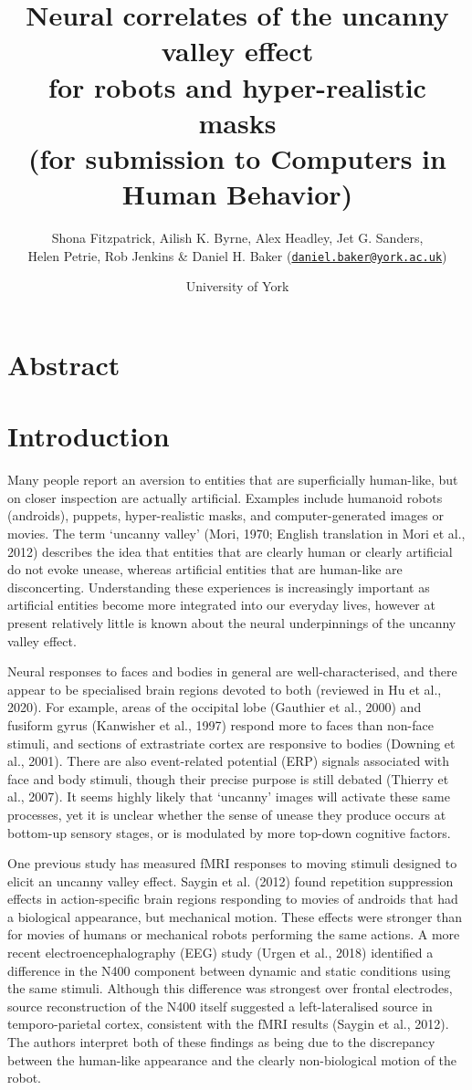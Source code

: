 \documentclass[
]{article}
\title{Neural correlates of the uncanny valley effect\\
for robots and hyper-realistic masks\\
(for submission to Computers in Human Behavior)}
\author{Shona Fitzpatrick, Ailish K. Byrne, Alex Headley, Jet G. Sanders,\\
Helen Petrie, Rob Jenkins \& Daniel H. Baker (\href{mailto:daniel.baker@york.ac.uk}{\nolinkurl{daniel.baker@york.ac.uk}})}
\date{University of York}
\begin{document}
\maketitle

\hypertarget{abstract}{%
\section{Abstract}\label{abstract}}

\hypertarget{introduction}{%
\section{Introduction}\label{introduction}}

Many people report an aversion to entities that are superficially human-like, but on closer inspection are actually artificial. Examples include humanoid robots (androids), puppets, hyper-realistic masks, and computer-generated images or movies. The term `uncanny valley' (Mori, 1970; English translation in Mori et al., 2012) describes the idea that entities that are clearly human or clearly artificial do not evoke unease, whereas artificial entities that are human-like are disconcerting. Understanding these experiences is increasingly important as artificial entities become more integrated into our everyday lives, however at present relatively little is known about the neural underpinnings of the uncanny valley effect.

Neural responses to faces and bodies in general are well-characterised, and there appear to be specialised brain regions devoted to both (reviewed in Hu et al., 2020). For example, areas of the occipital lobe (Gauthier et al., 2000) and fusiform gyrus (Kanwisher et al., 1997) respond more to faces than non-face stimuli, and sections of extrastriate cortex are responsive to bodies (Downing et al., 2001). There are also event-related potential (ERP) signals associated with face and body stimuli, though their precise purpose is still debated (Thierry et al., 2007). It seems highly likely that `uncanny' images will activate these same processes, yet it is unclear whether the sense of unease they produce occurs at bottom-up sensory stages, or is modulated by more top-down cognitive factors.

One previous study has measured fMRI responses to moving stimuli designed to elicit an uncanny valley effect. Saygin et al. (2012) found repetition suppression effects in action-specific brain regions responding to movies of androids that had a biological appearance, but mechanical motion. These effects were stronger than for movies of humans or mechanical robots performing the same actions. A more recent electroencephalography (EEG) study (Urgen et al., 2018) identified a difference in the N400 component between dynamic and static conditions using the same stimuli. Although this difference was strongest over frontal electrodes, source reconstruction of the N400 itself suggested a left-lateralised source in temporo-parietal cortex, consistent with the fMRI results (Saygin et al., 2012). The authors interpret both of these findings as being due to the discrepancy between the human-like appearance and the clearly non-biological motion of the robot.
\end{document}
